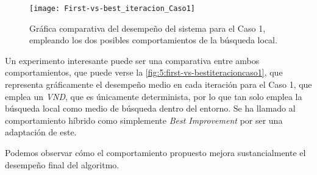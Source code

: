 \begin{figure}[t]
	\centering
	\texttt{[image: First-vs-best\_iteracion\_Caso1]}
	\caption{Gráfica comparativa del desempeño del sistema para el Caso 1, empleando los dos posibles comportamientos de la búsqueda local.}
	\label{fig:5:first-vs-bestiteracioncaso1}
\end{figure}

Un experimento interesante puede ser una comparativa entre ambos comportamientos, que puede verse la \autoref{fig:5:first-vs-bestiteracioncaso1}, que representa gráficamente el desempeño medio en cada iteración para el Caso 1, que emplea un \textit{VND}, que es únicamente determinista, por lo que tan solo emplea la búsqueda local como medio de búsqueda dentro del entorno. Se ha llamado al comportamiento híbrido como simplemente \textit{Best Improvement} por ser una adaptación de este.

Podemos observar cómo el comportamiento propuesto mejora sustancialmente el desempeño final del algoritmo.